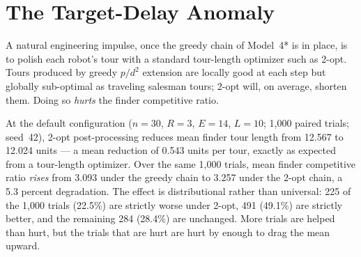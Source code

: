 \section{The Target-Delay Anomaly}\label{sec:target-delay}

A natural engineering impulse, once the greedy chain of Model~4* is
in place, is to polish each robot's tour with a standard tour-length
optimizer such as 2-opt. Tours produced by greedy $p/d^2$ extension
are locally good at each step but globally sub-optimal as traveling
salesman tours; 2-opt will, on average, shorten them. Doing so
\emph{hurts} the finder competitive ratio.

At the default configuration ($n=30$, $R=3$, $E=14$, $L=10$; 1,000
paired trials; seed~42), 2-opt post-processing reduces mean finder
tour length from 12.567 to 12.024 units --- a mean reduction of
0.543 units per tour, exactly as expected from a tour-length
optimizer. Over the same 1,000 trials, mean finder competitive ratio
\emph{rises} from 3.093 under the greedy chain to 3.257 under the
2-opt chain, a 5.3 percent degradation. The effect is distributional
rather than universal: 225 of the 1,000 trials (22.5\%) are strictly
worse under 2-opt, 491 (49.1\%) are strictly better, and the
remaining 284 (28.4\%) are unchanged. More trials are helped than
hurt, but the trials that are hurt are hurt by enough to drag the
mean upward.

